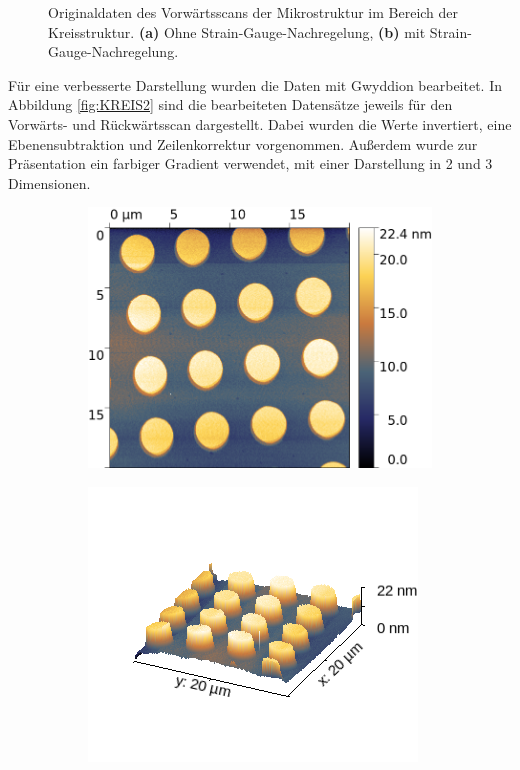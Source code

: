\begin{figure}[H]
\begin{subfigure}{0.49\textwidth}
        \caption{}
        \label{fig:A2}
    \end{subfigure}
    \caption{Originaldaten des Vorwärtsscans der Mikrostruktur im Bereich der Kreisstruktur. \textbf{(a)} Ohne Strain-Gauge-Nachregelung, \textbf{(b)} mit Strain-Gauge-Nachregelung.}
    \label{fig:KREIS1}
\end{figure}


Für eine verbesserte Darstellung wurden die Daten mit Gwyddion \cite{Gwyddion} bearbeitet. In Abbildung \ref{fig:KREIS2} sind 
die bearbeiteten Datensätze jeweils für den Vorwärts- und Rückwärtsscan dargestellt. Dabei wurden die Werte invertiert, eine Ebenensubtraktion und 
Zeilenkorrektur vorgenommen. Außerdem wurde zur Präsentation ein farbiger Gradient verwendet, mit einer Darstellung in 2 und 3 Dimensionen.

\begin{figure}[H]
    \centering
    \begin{subfigure}{0.49\textwidth}
        \includegraphics[width=\textwidth]{bilder/Mikrostruktur/Kreis_Vor_2D.png}
        \caption{}
    \end{subfigure}
    \begin{subfigure}{0.49\textwidth}
        \includegraphics[width=\textwidth]{bilder/Mikrostruktur/Kreis_Vor_3D.png}

\end{subfigure}
\end{figure}
